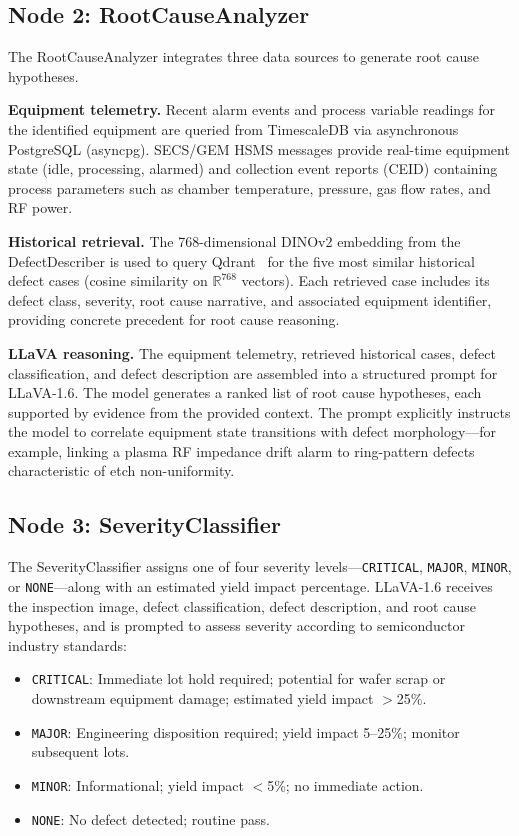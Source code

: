 \documentclass[conference]{IEEEtran}
\begin{document}
\subsection{Node 2: RootCauseAnalyzer}

The RootCauseAnalyzer integrates three data sources to generate root cause hypotheses.

\textbf{Equipment telemetry.} Recent alarm events and process variable readings for the identified equipment are queried from TimescaleDB via asynchronous PostgreSQL (asyncpg).
SECS/GEM HSMS messages provide real-time equipment state (idle, processing, alarmed) and collection event reports (CEID) containing process parameters such as chamber temperature, pressure, gas flow rates, and RF power.

\textbf{Historical retrieval.} The 768-dimensional DINOv2 embedding from the DefectDescriber is used to query Qdrant~\cite{qdrant2024} for the five most similar historical defect cases (cosine similarity on $\mathbb{R}^{768}$ vectors).
Each retrieved case includes its defect class, severity, root cause narrative, and associated equipment identifier, providing concrete precedent for root cause reasoning.

\textbf{LLaVA reasoning.} The equipment telemetry, retrieved historical cases, defect classification, and defect description are assembled into a structured prompt for LLaVA-1.6.
The model generates a ranked list of root cause hypotheses, each supported by evidence from the provided context.
The prompt explicitly instructs the model to correlate equipment state transitions with defect morphology---for example, linking a plasma RF impedance drift alarm to ring-pattern defects characteristic of etch non-uniformity.

\subsection{Node 3: SeverityClassifier}

The SeverityClassifier assigns one of four severity levels---\texttt{CRITICAL}, \texttt{MAJOR}, \texttt{MINOR}, or \texttt{NONE}---along with an estimated yield impact percentage.
LLaVA-1.6 receives the inspection image, defect classification, defect description, and root cause hypotheses, and is prompted to assess severity according to semiconductor industry standards:

\begin{itemize}[leftmargin=*]
    \item \texttt{CRITICAL}: Immediate lot hold required; potential for wafer scrap or downstream equipment damage; estimated yield impact $>$25\%.
    \item \texttt{MAJOR}: Engineering disposition required; yield impact 5--25\%; monitor subsequent lots.
    \item \texttt{MINOR}: Informational; yield impact $<$5\%; no immediate action.
    \item \texttt{NONE}: No defect detected; routine pass.
\end{itemize}
\end{document}
